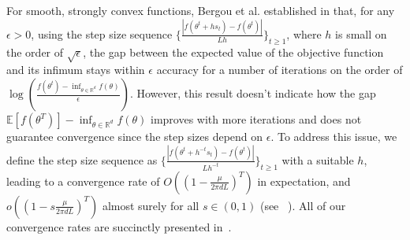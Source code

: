 \documentclass{article} %
\begin{document}
For smooth, strongly convex functions, Bergou et al. established in \cite[Theorem 6.3]{bergou2020stochastic} that, for any $\epsilon > 0$, using the step size sequence $  \{\frac{|f(\theta^{t} + h s_t) - f(\theta^t)|}{Lh}\}_{t\ge 1}$, where $h$ is small on the order of $\sqrt{\epsilon}$, the gap between the expected value of the objective function and its infimum stays within $\epsilon$ accuracy for 
a number of iterations 
on the order of $\log(\frac{ f(\theta^t) - \inf_{\theta \in \mathbb{R}^d } f(\theta) }{\epsilon})$. 
However, this result doesn't indicate how the gap $\mathbb{E}[f(\theta^T)] -\inf_{\theta \in \mathbb{R}^d} f(\theta) $ improves with more iterations and does not guarantee convergence since the step sizes depend on $\epsilon$. To address this issue, we define the step size sequence as $\{ \frac{|f(\theta^{t} + h^{-t} s_t) - f(\theta^t)|}{Lh^{-t}} \}_{t \ge 1}$ with a suitable $h$, leading to a convergence rate of $O((1-\frac{\mu}{2\pi dL})^T)$ in expectation, and $o((1-s \frac{\mu}{2\pi dL})^T)$ almost surely for all $s \in (0,1)$ (see ~). All of our convergence rates are succinctly presented in~.
\end{document}
